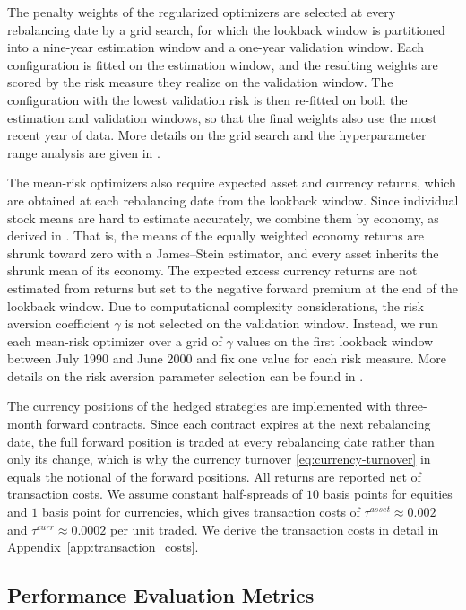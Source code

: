 The penalty weights of the regularized optimizers are selected at every rebalancing date by a grid search, for which the
lookback window is partitioned into a nine-year estimation window and a one-year validation window. Each configuration is
fitted on the estimation window, and the resulting weights are scored by the risk measure they realize on the validation
window. The
configuration with the lowest validation risk is then re-fitted on both the estimation and validation windows, so that the final weights
also use the most recent year of data. More details on the grid search and the hyperparameter range analysis are given in
.

The mean-risk optimizers also require expected asset and currency returns, which are obtained at each
rebalancing date from the lookback window. Since individual stock means are hard to estimate accurately, we combine them by economy, as derived in . That is, the means of the equally weighted 
economy returns are shrunk toward zero with a
James--Stein estimator, and every asset inherits the shrunk mean of its economy. The expected excess currency returns are
not estimated from returns but set to the negative forward premium at the end of the lookback window. 
Due to computational complexity considerations, the risk aversion coefficient $\gamma$ is not selected on the
validation window. Instead, we run each mean-risk optimizer over a grid of $\gamma$ values on the first lookback window between July 1990 and June 2000 and fix one value for each risk
measure. More details on the risk aversion parameter selection can be found in .


The currency positions of the hedged strategies are implemented with three-month forward contracts. Since each contract
expires at the next rebalancing date, the full forward position is traded at every rebalancing date rather than only its
change, which is why the currency turnover \eqref{eq:currency-turnover} in  equals the notional of the
forward positions. All returns are reported net of transaction costs. We assume constant half-spreads of $10$ basis points for equities and $1$ basis
point for currencies, which gives transaction costs of
$\tau^{asset} \approx 0.002$ and $\tau^{curr} \approx 0.0002$ per unit traded.  We derive the 
transaction costs in detail in Appendix~\ref{app:transaction_costs}.

\subsection{Performance Evaluation Metrics}
\label{sec:performance-evaluation-metrics}

